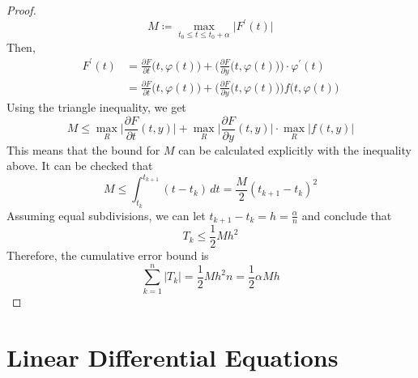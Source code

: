 \documentclass{article}
\begin{document}
\begin{proof}
\begin{equation}
      M \coloneqq \max_{t_0 \leq t \leq t_0 + \alpha} \big| F^\prime (t) \big|
    \end{equation}
    Then, 
    \begin{align*}
        F^\prime (t) & = \frac{\partial F}{\partial t} \big(t, \varphi(t)\big) + \bigg( \frac{\partial F}{\partial y} \big(t, \varphi(t)\big) \bigg) \cdot \varphi^\prime (t) \\
        & = \frac{\partial F}{\partial t} \big(t, \varphi (t)\big) + \bigg(\frac{\partial F}{\partial y} \big(t, \varphi(t)\big) \bigg) f \big(t, \varphi(t)\big)
    \end{align*}
    Using the triangle inequality, we get
    \begin{equation}
      M \leq \max_R \Big| \frac{\partial F}{\partial t} (t, y)\Big| + \max_R \Big| \frac{\partial F}{\partial y} (t, y)\Big| \cdot \max_R \Big| f(t, y) \Big|
    \end{equation}
    This means that the bound for $M$ can be calculated explicitly with the inequality above. It can be checked that
    \begin{equation}
      M \leq \int_{t_k}^{t_{k+1}} (t - t_k) \, dt = \frac{M}{2}(t_{k+1} - t_k)^2
    \end{equation}
    Assuming equal subdivisions, we can let $t_{k+1} - t_k = h = \frac{\alpha}{n}$ and conclude that 
    \begin{equation}
      T_k \leq \frac{1}{2} M h^2
    \end{equation}
    Therefore, the cumulative error bound is 
    \begin{equation}
      \sum_{k=1}^n |T_k| = \frac{1}{2} M h^2 n = \frac{1}{2} \alpha M h
    \end{equation}
    \end{proof}

\section{Linear Differential Equations}
\end{document}
